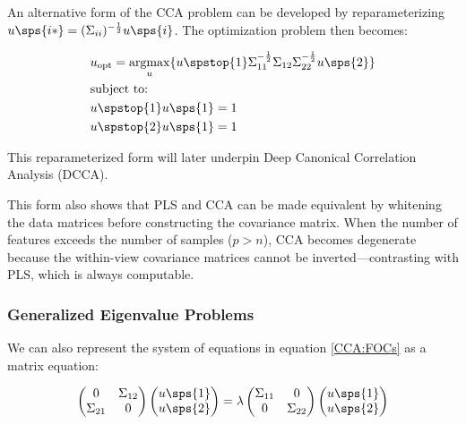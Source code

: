 An alternative form of the CCA problem can be developed by reparameterizing \(u\sps{i*}=(\Sigma_{ii})^{-\frac{1}{2}}u\sps{i}\). The optimization problem then becomes:

\begin{align}
     & u_{\text{opt}}=\underset{u}{\mathrm{argmax}}\{ u\spstop{1}\Sigma_{11}^{-\frac{1}{2}}\Sigma_{12}\Sigma_{22}^{-\frac{1}{2}}u\sps{2} \} \\
     & \text{subject to:} \notag \\
     & u\spstop{1}u\sps{1}=1 \notag \\
     & u\spstop{2}u\sps{1}=1 \notag
\end{align}

This reparameterized form will later underpin Deep Canonical Correlation Analysis (DCCA).

This form also shows that PLS and CCA can be made equivalent by whitening the data matrices before constructing the covariance matrix. When the number of features exceeds the number of samples (\(p>n\)), CCA becomes degenerate because the within-view covariance matrices cannot be inverted—contrasting with PLS, which is always computable.

\subsubsection{Generalized Eigenvalue Problems}

We can also represent the system of equations in equation \ref{CCA:FOCs} as a matrix equation:

\begin{align}
    \begin{pmatrix}
        0 & \Sigma_{12} \\
        \Sigma_{21} & 0
    \end{pmatrix}
    \begin{pmatrix}
        u\sps{1} \\
        u\sps{2}
    \end{pmatrix}
    =
    \lambda
    \begin{pmatrix}
        \Sigma_{11} & 0 \\
        0                    & \Sigma_{22}
    \end{pmatrix}
    \begin{pmatrix}
        u\sps{1} \\
        u\sps{2}
    \end{pmatrix}
\end{align}

